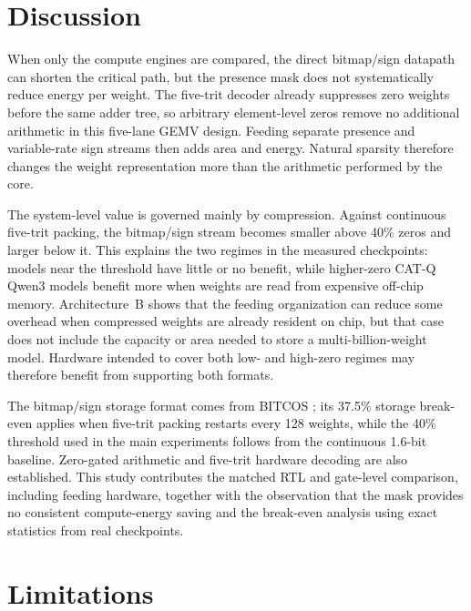 \documentclass[11pt]{article}
\begin{document}
\section{Discussion}

When only the compute engines are compared, the direct bitmap/sign datapath can shorten the critical path, but the presence mask does not systematically reduce energy per weight. The five-trit decoder already suppresses zero weights before the same adder tree, so arbitrary element-level zeros remove no additional arithmetic in this five-lane GEMV design. Feeding separate presence and variable-rate sign streams then adds area and energy. Natural sparsity therefore changes the weight representation more than the arithmetic performed by the core.

The system-level value is governed mainly by compression. Against continuous five-trit packing, the bitmap/sign stream becomes smaller above 40\% zeros and larger below it. This explains the two regimes in the measured checkpoints: models near the threshold have little or no benefit, while higher-zero CAT-Q Qwen3 models benefit more when weights are read from expensive off-chip memory. Architecture~B shows that the feeding organization can reduce some overhead when compressed weights are already resident on chip, but that case does not include the capacity or area needed to store a multi-billion-weight model. Hardware intended to cover both low- and high-zero regimes may therefore benefit from supporting both formats.

The bitmap/sign storage format comes from BITCOS \cite{georganas2026bitcos}; its 37.5\% storage break-even applies when five-trit packing restarts every 128 weights, while the 40\% threshold used in the main experiments follows from the continuous 1.6-bit baseline. Zero-gated arithmetic and five-trit hardware decoding are also established. This study contributes the matched RTL and gate-level comparison, including feeding hardware, together with the observation that the mask provides no consistent compute-energy saving and the break-even analysis using exact statistics from real checkpoints.

\section{Limitations}
\end{document}
